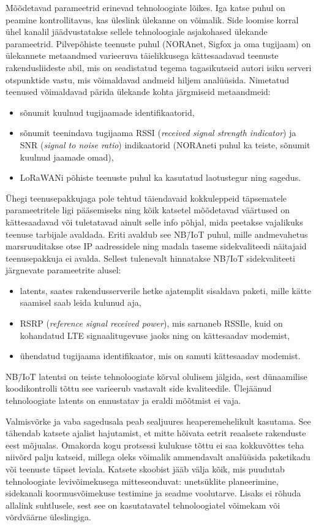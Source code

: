 \documentclass[12pt]{article}
\begin{document}
    Mõõdetavad parameetrid erinevad tehnoloogiate lõikes.
    Iga katse puhul on peamine kontrollitavus, kas üleslink ülekanne on võimalik.
    Side loomise korral ühel kanalil jäädvustatakse sellele tehnoloogiale asjakohased ülekande parameetrid.
    Pilvepõhiste teenuste puhul (NORAnet, Sigfox ja oma tugijaam) on ülekannete metaandmed varieeruva täielikkusega kättesaadavad teenuste rakendusliideste abil, mis on seadistatud tegema tagasikutseid autori isiku serveri otspunktide vastu, mis võimaldavad andmeid hiljem analüüsida.
    Nimetatud teenused võimaldavad pärida ülekande kohta järgmiseid metaandmeid:
    \begin{itemize}
        \item sõnumit kuulnud tugijaamade identifikaatorid,
        \item sõnumit teenindava tugijaama RSSI (\textit{received signal strength indicator}) ja SNR (\textit{signal to noise ratio}) indikaatorid (NORAneti puhul ka teiste, sõnumit kuulnud jaamade omad),
        \item LoRaWANi põhiste teenuste puhul ka kasutatud laotustegur ning sagedus.
    \end{itemize}
    Ühegi teenusepakkujaga pole tehtud täiendavaid kokkuleppeid täpsematele parameetritele ligi pääsemiseks ning kõik katsetel mõõdetavad väärtused on kättesaadavad või tuletatavad ainult selle info põhjal, mida peetakse vajalikuks teenuse tarbijale avaldada.
    Eriti avaldub see NB\=/IoT puhul, mille andmevahetus marsruuditakse otse IP aadressidele ning madala taseme sidekvaliteedi näitajaid teenusepakkuja ei avalda.
    Sellest tulenevalt hinnatakse NB\=/IoT sidekvaliteeti järgnevate parameetrite alusel:
    \begin{itemize}
        \item latents, saates rakendusserverile hetke ajatemplit sisaldava paketi, mille kätte saamisel saab leida kulunud aja,
        \item RSRP (\textit{reference signal received power}), mis sarnaneb RSSIle, kuid on kohandatud LTE signaalitugevuse jaoks ning on kättesaadav modemist,
        \item ühendatud tugijaama identifikaator, mis on samuti kättesaadav modemist.
    \end{itemize}
    NB\=/IoT latentsi on teiste tehnoloogiate kõrval olulisem jälgida, sest dünaamilise koodikontrolli tõttu see varieerub vastavalt side kvaliteedile.
    Ülejäänud tehnoloogiate latents on ennustatav ja eraldi mõõtmist ei vaja.

    Valmisvõrke ja vaba sagedusala peab sealjuures heaperemehelikult kasutama.
    See tähendab katsete ajalist hajutamist, et mitte hõivata eetrit reaalsete rakenduste eest mõjualas.
    Omakorda kogu protsessi kulukuse tõttu ei saa kokkuvõttes teha niivõrd palju katseid, millega oleks võimalik ammendavalt analüüsida paketikadu või teenuste täpset leviala.
    Katsete skoobist jääb välja kõik, mis puudutab tehnoloogiate levivõimekusega mitteseonduvat: unetsüklite planeerimine, sidekanali koormusvõimekuse testimine ja seadme voolutarve.
    Lisaks ei rõhuda allalink suhtlusele, sest see on kasutatavatel tehnoloogiatel võimekam või võrdväärne üleslingiga.
\end{document}
